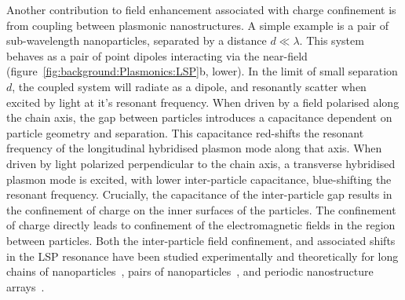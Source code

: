 Another contribution to field enhancement associated with charge confinement is from coupling between plasmonic nanostructures. A simple example is a pair of sub-wavelength nanoparticles, separated by a distance $d \ll \lambda$. This system behaves as a pair of point dipoles interacting via the near-field (figure~\ref{fig:background:Plasmonics:LSP}b, lower). In the limit of small separation $d$, the coupled system will radiate as a dipole, and resonantly scatter when excited by light at it's resonant frequency. When driven by a field polarised along the chain axis, the gap between particles introduces a capacitance dependent on particle geometry and separation. This capacitance red-shifts the resonant frequency of the longitudinal hybridised plasmon mode along that axis. When driven by light polarized perpendicular to the chain axis, a transverse hybridised plasmon mode is excited, with lower inter-particle capacitance, blue-shifting the resonant frequency. Crucially, the capacitance of the inter-particle gap results in the confinement of charge on the inner surfaces of the particles. The confinement of charge directly leads to confinement of the electromagnetic fields in the region between particles. Both the inter-particle field confinement, and associated shifts in the LSP resonance have been studied experimentally and theoretically for long chains of nanoparticles~\cite{Krenn1999, Krenn1999a}, pairs of nanoparticles~\cite{Huang2016}, and periodic nanostructure arrays~\cite{Lee2016, Valev2011b, Valev2012a}.

